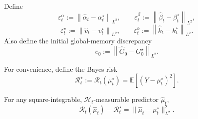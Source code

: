 \documentclass{llmxive}
\providecommand{\E}{\mathbb{E}}
\providecommand{\cH}{\mathcal{H}}
\providecommand{\norm}[1]{\left\lVert #1 \right\rVert}
\begin{document}
\begin{definition}
\label{ass:gla_errors}
Define
\begin{equation}
\varepsilon_t^\alpha := \norm{\hat\alpha_t-\alpha_t^\star}_{L^2},
\qquad
\varepsilon_t^\beta := \norm{\hat\beta_t-\beta_t^\star}_{L^2},
\label{eq:gate_errors}
\end{equation}
\begin{equation}
\varepsilon_t^v := \norm{\hat v_t-v_t^\star}_{L^2},
\qquad
\varepsilon_t^k := \norm{\hat k_t-k_t^\star}_{L^2}.
\label{eq:feature_errors}
\end{equation}
Also define the initial global-memory discrepancy
\begin{equation}
e_0 := \norm{\hat G_0-G_0^\star}_{L^2}.
\label{eq:initial_memory_error}
\end{equation}
\end{definition}

For convenience, define the Bayes risk
\begin{equation}
\mathcal R_t^\star := \mathcal R_t(\mu_t^\star) = \E[(Y-\mu_t^\star)^2].
\label{eq:bayes_risk}
\end{equation}









\begin{lemma}
\label{lem:bayes_excess_identity}
For any square-integrable, $\cH_t$-measurable predictor $\hat\mu_t$,
\begin{equation}
\mathcal R_t(\hat\mu_t)-\mathcal R_t^\star
=
\|\hat\mu_t-\mu_t^\star\|_{L^2}^2.
\label{eq:bayes_excess_identity}
\end{equation}
\end{lemma}
\end{document}
